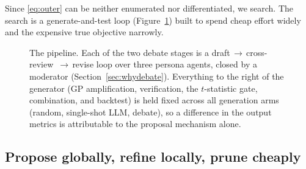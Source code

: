\documentclass{article}
\theoremstyle{definition}
\theoremstyle{plain}
\theoremstyle{remark}
\begin{document}
Since \eqref{eq:outer} can be neither enumerated nor differentiated, we search. The
search is a generate-and-test loop (Figure~\ref{fig:pipeline}) built to spend cheap
effort widely and the expensive true objective narrowly.

\begin{figure}[t]
\centering
\scriptsize
{}
\caption{The pipeline. Each of the two debate stages is a draft\,$\to$\,cross-review%
\,$\to$\,revise loop over three persona agents, closed by a moderator
(Section~\ref{sec:whydebate}). Everything to the right of the generator (GP
amplification, verification, the $t$-statistic gate, combination, and backtest) is held
fixed across all generation arms (random, single-shot LLM, debate), so a difference in
the output metrics is attributable to the proposal mechanism alone.}
\label{fig:pipeline}
\end{figure}

\subsection{Propose globally, refine locally, prune cheaply}
\end{document}
